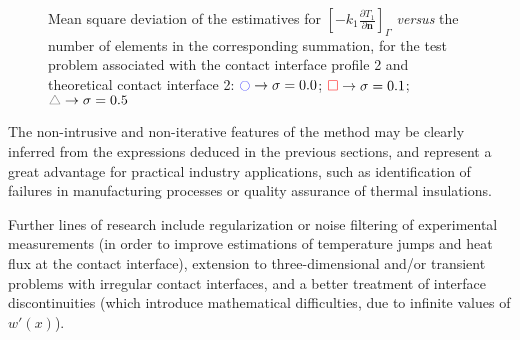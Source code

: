 \documentclass[conference,compsoc,fleqn]{IEEEtran}
\begin{document}
\begin{figure}[H]
	\begin{center}			
		\caption{Mean square deviation of the estimatives for $\left[-k_1 \frac{\partial T_1}{\partial \mathbf{n}}\right]_\Gamma$ \textit{versus} the number of  elements in the corresponding summation, for the test problem associated with the contact interface profile 2 and theoretical contact interface 2: $\textcolor{blue}{\ocircle} \rightarrow \sigma = 0.0$; $\textcolor{red}{\square} \rightarrow \sigma = 0.1$; $\textcolor{gray}{\triangle} \rightarrow \sigma = 0.5$}
		\label{erro_rms_2}
	\end{center}
\end{figure}

The non-intrusive and non-iterative features of the method may be clearly inferred from the expressions deduced in the previous sections, and represent a great advantage for practical industry applications, such as identification of failures in manufacturing processes or quality assurance of thermal insulations.

Further lines of research include regularization or noise filtering of experimental measurements (in order to improve estimations of temperature jumps and heat flux at the contact interface), extension to three-dimensional and/or transient problems with irregular contact interfaces, and a better treatment of interface discontinuities (which introduce mathematical difficulties, due to infinite values of $w'(x)$).
\\
\end{document}
